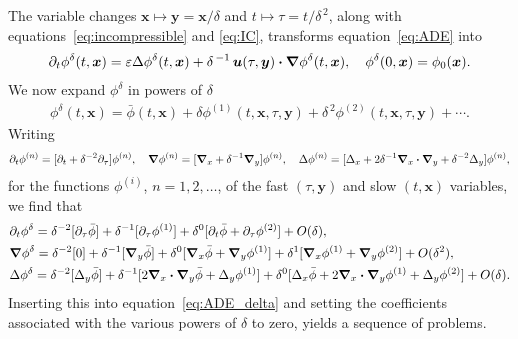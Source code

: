 \documentclass[leqno,onefignum,onetabnum]{siamltex1213}
\newcommand\bnabla{\mbox{\boldmath${\nabla}$}}
\providecommand\bcdot{\boldsymbol{\cdot}}
\newcommand{\vecx}{\boldsymbol{x}}
\newcommand{\vecy}{\boldsymbol{y}}
\newcommand{\vecu}{\boldsymbol{u}}
\begin{document}
The variable changes $\vecx\mapsto\vecy=\vecx/\delta$ and
$t\mapsto\tau=t/\delta^{\,2}$, along with equations~\eqref{eq:incompressible} and
\eqref{eq:IC}, transforms equation~\eqref{eq:ADE}
into~\cite{McLaughlin:SIAM_JAM:780}     
%
\begin{align}\label{eq:ADE_delta}
  \partial_t\phi^\delta(t,\vecx)=\varepsilon\Delta\phi^\delta(t,\vecx)
                 +\delta^{\,-1}\,\vecu (\tau,\vecy)\bcdot\bnabla \phi^\delta(t,\vecx), \quad
      \phi^\delta(0,\vecx)=\phi_0(\vecx).
\end{align}
%
We now expand $\phi^\delta$ in powers of $\delta$~\cite{McLaughlin:SIAM_JAM:780} 
%
\begin{align}\label{eq:Expand}
  \phi^\delta(t,\vecx)=\bar{\phi}(t,\vecx)
                 +\delta\phi^{(1)}(t,\vecx,\tau,\vecy)
                 +\delta^{\,2}\phi^{(2)}(t,\vecx,\tau,\vecy)+\cdots.
\end{align}
%
Writing
%
\begin{align*}
  \partial_t\phi^{(n)}=[\partial_t+\delta^{-2}\partial_\tau]\phi^{(n)}, \quad
  \bnabla \phi^{(n)}=[\bnabla _x+\delta^{-1}\bnabla _y]\phi^{(n)}, \quad
  \Delta\phi^{(n)}=[\Delta_x+2\delta^{-1}\bnabla _x\bcdot\bnabla _y+\delta^{-2}\Delta_y]\phi^{(n)},
\end{align*}
%
for the functions $\phi^{(i)}$, $n=1,2,\ldots$, of the fast $(\tau,\vecy)$ and
slow $(t,\vecx)$ variables, we find that
%
\begin{align}
  &\partial_t\phi^\delta=\delta^{-2}[\partial_\tau\bar{\phi}]
      +\delta^{-1}[\partial_\tau\phi^{(1)}]
      +\delta^0[\partial_t\bar{\phi}+\partial_\tau\phi^{(2)}]+O(\delta),
      \\
  &\bnabla \phi^\delta=\delta^{-2}[0]
            +\delta^{-1}[\bnabla _y\bar{\phi}]
            +\delta^0[\bnabla _x\bar{\phi}+\bnabla _y\phi^{(1)}]
            +\delta^1[\bnabla _x\phi^{(1)}+\bnabla _y\phi^{(2)}]+O(\delta^2),
            \notag\\
  &\Delta\phi^\delta=\delta^{-2}[\Delta_y\bar{\phi}]
      +\delta^{-1}[2\bnabla _x\bcdot\bnabla _y\bar{\phi}+\Delta_y\phi^{(1)}]
      +\delta^0[\Delta_x\bar{\phi}+2\bnabla _x\bcdot\bnabla _y\phi^{(1)}+\Delta_y\phi^{(2)}]+O(\delta).
      \notag
\end{align}
%
Inserting this into equation~\eqref{eq:ADE_delta} and setting the
coefficients associated with the various powers of $\delta$ to zero,
yields a sequence of problems.
\end{document}
